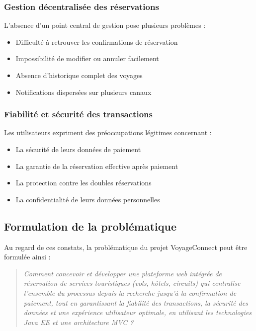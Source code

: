 \documentclass[12pt,a4paper]{report}
\begin{document}
\subsubsection{Gestion décentralisée des réservations}

L'absence d'un point central de gestion pose plusieurs problèmes :

\begin{itemize}
    \item Difficulté à retrouver les confirmations de réservation
    \item Impossibilité de modifier ou annuler facilement
    \item Absence d'historique complet des voyages
    \item Notifications dispersées sur plusieurs canaux
\end{itemize}

\subsubsection{Fiabilité et sécurité des transactions}

Les utilisateurs expriment des préoccupations légitimes concernant :

\begin{itemize}
    \item La sécurité de leurs données de paiement
    \item La garantie de la réservation effective après paiement
    \item La protection contre les doubles réservations
    \item La confidentialité de leurs données personnelles
\end{itemize}

\subsection{Formulation de la problématique}

Au regard de ces constats, la problématique du projet VoyageConnect peut être formulée ainsi :

\begin{quote}
\textit{Comment concevoir et développer une plateforme web intégrée de réservation de services touristiques (vols, hôtels, circuits) qui centralise l'ensemble du processus depuis la recherche jusqu'à la confirmation de paiement, tout en garantissant la fiabilité des transactions, la sécurité des données et une expérience utilisateur optimale, en utilisant les technologies Java EE et une architecture MVC ?}
\end{quote}
\end{document}
